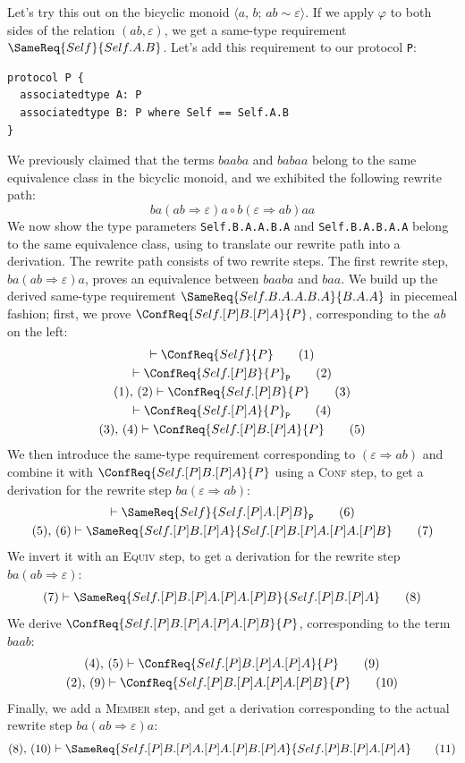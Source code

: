 \documentclass[../generics]{subfiles}
\begin{document}
Let's try this out on the bicyclic monoid $\langle a,\,b;\,ab\sim\varepsilon\rangle$. If we apply $\varphi$ to both sides of the relation $(ab,\varepsilon)$, we get a same-type requirement $\SameReq{Self}{Self.A.B}$. Let's add this requirement to our protocol \texttt{P}:
\begin{Verbatim}
protocol P {
  associatedtype A: P
  associatedtype B: P where Self == Self.A.B
}
\end{Verbatim}
We previously claimed that the terms $baaba$ and $babaa$ belong to the same equivalence class in the bicyclic monoid, and we exhibited the following rewrite path:
\[
ba(ab\Rightarrow\varepsilon)a \circ
b(\varepsilon\Rightarrow ab)aa
\]
We now show the type parameters \verb|Self.B.A.A.B.A| and \verb|Self.B.A.B.A.A| belong to the same equivalence class, using  to translate our rewrite path into a derivation. The rewrite path consists of two rewrite steps. The first rewrite step, $ba(ab\Rightarrow\varepsilon)a$, proves an equivalence between $baaba$ and $baa$. We build up the derived same-type requirement $\SameReq{Self.B.A.A.B.A}{B.A.A}$ in piecemeal fashion; first, we prove $\ConfReq{Self.[P]B.[P]A}{P}$, corresponding to the $ab$ on the left:
\begin{gather*}
\vdash\ConfReq{Self}{P}\tag{1}\\
\vdash\ConfReq{Self.[P]B}{P}_\texttt{P}\tag{2}\\
(1),\,(2)\vdash\ConfReq{Self.[P]B}{P}\tag{3}\\
\vdash\ConfReq{Self.[P]A}{P}_\texttt{P}\tag{4}\\
(3),\,(4)\vdash\ConfReq{Self.[P]B.[P]A}{P}\tag{5}
\end{gather*}
We then introduce the same-type requirement corresponding to $(\varepsilon\Rightarrow ab)$ and combine it with $\ConfReq{Self.[P]B.[P]A}{P}$ using a \textsc{Conf} step, to get a derivation for the rewrite step $ba(\varepsilon\Rightarrow ab)$:
\begin{gather*}
\vdash\SameReq{Self}{Self.[P]A.[P]B}_\texttt{P}\tag{6}\\
(5),\,(6)\vdash\SameReq{Self.[P]B.[P]A}{Self.[P]B.[P]A.[P]A.[P]B}\tag{7}
\end{gather*}
We invert it with an \textsc{Equiv} step, to get a derivation for the rewrite step $ba(ab\Rightarrow \varepsilon)$:
\begin{gather*}
(7)\vdash\SameReq{Self.[P]B.[P]A.[P]A.[P]B}{Self.[P]B.[P]A}\tag{8}
\end{gather*}
We derive $\ConfReq{Self.[P]B.[P]A.[P]A.[P]B}{P}$, corresponding to the term $baab$:
\begin{gather*}
(4),\,(5)\vdash\ConfReq{Self.[P]B.[P]A.[P]A}{P}\tag{9}\\
(2),\,(9)\vdash\ConfReq{Self.[P]B.[P]A.[P]A.[P]B}{P}\tag{10}
\end{gather*}
Finally, we add a \textsc{Member} step, and get a derivation corresponding to the actual rewrite step $ba(ab\Rightarrow\varepsilon)a$:
\begin{gather*}
(8),\,(10)\vdash\SameReq{Self.[P]B.[P]A.[P]A.[P]B.[P]A}{Self.[P]B.[P]A.[P]A}\tag{11}
\end{gather*}
\end{document}
